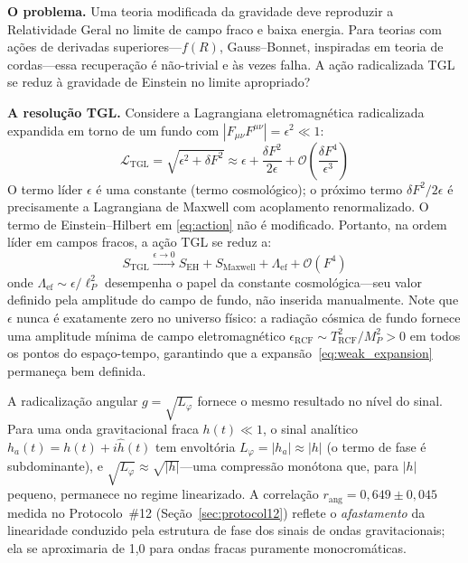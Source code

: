 \documentclass[12pt,a4paper,twocolumn]{article}
\begin{document}
\textbf{O problema.} Uma teoria modificada da gravidade deve reproduzir a
Relatividade Geral no limite de campo fraco e baixa energia. Para teorias
com ações de derivadas superiores---$f(R)$, Gauss--Bonnet, inspiradas em
teoria de cordas---essa recuperação é não-trivial e às vezes falha. A ação
radicalizada TGL se reduz à gravidade de Einstein no limite apropriado?

\textbf{A resolução TGL.} Considere a Lagrangiana eletromagnética radicalizada
expandida em torno de um fundo com $|F_{\mu\nu}F^{\mu\nu}| = \epsilon^2 \ll 1$:
\begin{equation}
\mathcal{L}_{\text{TGL}} = \sqrt{\epsilon^2 + \delta F^2} \approx \epsilon
+ \frac{\delta F^2}{2\epsilon} + \mathcal{O}\!\left(\frac{\delta F^4}{\epsilon^3}
\right)
\label{eq:weak_expansion}
\end{equation}
O termo líder $\epsilon$ é uma constante (termo cosmológico); o
próximo termo $\delta F^2 / 2\epsilon$ é precisamente a Lagrangiana de Maxwell
com acoplamento renormalizado. O termo de Einstein--Hilbert em
\eqref{eq:action} não é modificado. Portanto, na ordem líder em campos fracos,
a ação TGL se reduz a:
\begin{equation}
S_{\text{TGL}} \xrightarrow{\epsilon \to 0} S_{\text{EH}} + S_{\text{Maxwell}}
+ \Lambda_{\text{ef}} + \mathcal{O}(F^4)
\label{eq:GR_limit}
\end{equation}
onde $\Lambda_{\text{ef}} \sim \epsilon/\ell_P^2$ desempenha o papel da
constante cosmológica---seu valor definido pela amplitude do campo de fundo,
não inserida manualmente. Note que $\epsilon$ nunca é exatamente zero no
universo físico: a radiação cósmica de fundo fornece uma amplitude mínima de
campo eletromagnético $\epsilon_{\text{RCF}} \sim T_{\text{RCF}}^2 / M_P^2 > 0$
em todos os pontos do espaço-tempo, garantindo que a expansão~\eqref{eq:weak_expansion}
permaneça bem definida.

A radicalização angular $g = \sqrt{L_\varphi}$ fornece o mesmo resultado no
nível do sinal. Para uma onda gravitacional fraca $h(t) \ll 1$, o sinal
analítico $h_a(t) = h(t) + i\hat{h}(t)$ tem envoltória $L_\varphi = |h_a| \approx
|h|$ (o termo de fase é subdominante), e $\sqrt{L_\varphi} \approx
\sqrt{|h|}$---uma compressão monótona que, para $|h|$ pequeno, permanece no
regime linearizado. A correlação $r_{\text{ang}} = 0{,}649 \pm 0{,}045$
medida no Protocolo~\#12 (Seção~\ref{sec:protocol12}) reflete o
\emph{afastamento} da linearidade conduzido pela estrutura de fase dos
sinais de ondas gravitacionais; ela se aproximaria de 1{,}0 para ondas fracas
puramente monocromáticas.
\end{document}
